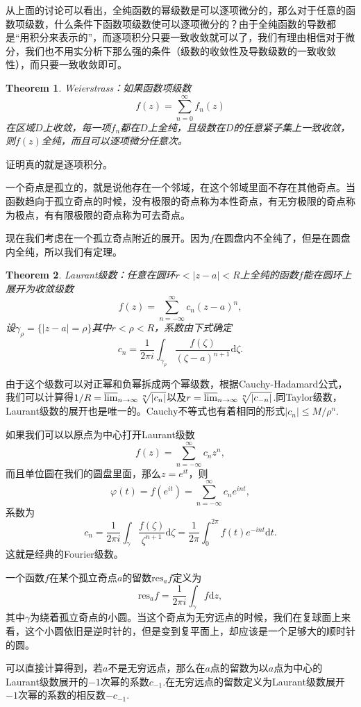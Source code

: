 \documentclass[10pt]{book}
\theoremstyle{plain}%
\newtheorem{theo}{Theorem}[chapter]%
\begin{document}
从上面的讨论可以看出，全纯函数的幂级数是可以逐项微分的，那么对于任意的函数项级数，什么条件下函数项级数使可以逐项微分的？由于全纯函数的导数都是“用积分来表示的”，而逐项积分只要一致收敛就可以了，我们有理由相信对于微分，我们也不用实分析下那么强的条件（级数的收敛性及导数级数的一致收敛性），而只要一致收敛即可。

\begin{theo}
	Weierstrass：如果函数项级数\[f(z)=\sum_{n=0}^\infty f_n(z)\]在区域$D$上收敛，每一项$f_n$都在$D$上全纯，且级数在$D$的任意紧子集上一致收敛，则$f(z)$全纯，而且可以逐项微分任意次。
\end{theo}
证明真的就是逐项积分。

一个奇点是孤立的，就是说他存在一个邻域，在这个邻域里面不存在其他奇点。当函数趋向于孤立奇点的时候，没有极限的奇点称为本性奇点，有无穷极限的奇点称为极点，有有限极限的奇点称为可去奇点。

现在我们考虑在一个孤立奇点附近的展开。因为$f$在圆盘内不全纯了，但是在圆盘内全纯，所以我们有定理。
\begin{theo}
	Laurant级数：任意在圆环$r<|z-a|<R$上全纯的函数$f$能在圆环上展开为收敛级数\[f(z)=\sum_{n=-\infty}^\infty c_n(z-a)^n,\]设$\gamma_\rho=\{|z-a|=\rho\}$其中$r<\rho<R$，系数由下式确定
	\[
	c_n=\frac{1}{2\pi i}\int_{\gamma_\rho}\frac{f(\zeta)}{(\zeta -a)^{n+1}}\mathrm{d}\zeta.
	\]
\end{theo}
由于这个级数可以对正幂和负幂拆成两个幂级数，根据Cauchy-Hadamard公式，我们可以计算得$1/R=\varlimsup_{n\to \infty} \sqrt[n]{|c_n|}$以及$r=\varlimsup_{n\to \infty} \sqrt[n]{|c_{-n}|}$.同Taylor级数，Laurant级数的展开也是唯一的。Cauchy不等式也有着相同的形式$|c_n|\leq M/\rho^n$.

如果我们可以以原点为中心打开Laurant级数\[f(z)=\sum_{n=-\infty}^\infty c_nz^n,\]而且单位圆在我们的圆盘里面，那么$z=e^{it}$，则\[\varphi(t)=f(e^{it})=\sum_{n=-\infty}^\infty c_ne^{int},\]系数为
	\[
	c_n=\frac{1}{2\pi i}\int_{\gamma}\frac{f(\zeta)}{\zeta^{n+1}}\mathrm{d}\zeta=\frac{1}{2\pi}\int_0^{2\pi}f(t)e^{-int}\mathrm{d}t.
	\]
这就是经典的Fourier级数。
	
	一个函数$f$在某个孤立奇点$a$的留数$\mathrm{res}_af$定义为\[\mathrm{res}_af=\frac{1}{2\pi i}\int_{\gamma}f\mathrm{d}z,\]其中$\gamma$为绕着孤立奇点的小圆。当这个奇点为无穷远点的时候，我们在复球面上来看，这个小圆依旧是逆时针的，但是变到复平面上，却应该是一个足够大的顺时针的圆。
	
	可以直接计算得到，若$a$不是无穷远点，那么在$a$点的留数为以$a$点为中心的Laurant级数展开的$-1$次幂的系数$c_{-1}$.在无穷远点的留数定义为Laurant级数展开$-1$次幂的系数的相反数$-c_{-1}$.
	
\end{document}
